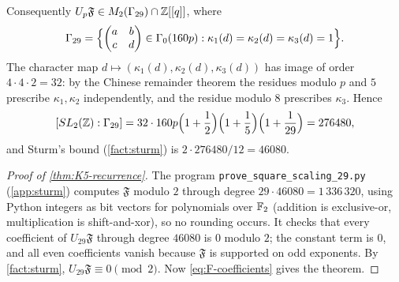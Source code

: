 Consequently $U_p\mathfrak F\in M_2(\Gamma_{29})\cap\mathbb{Z}[[q]]$, where
\[
  \Gamma_{29}=\Bigl\{\begin{pmatrix}a&b\\c&d\end{pmatrix}\in\Gamma_0(160p):
  \kappa_1(d)=\kappa_2(d)=\kappa_3(d)=1\Bigr\}.
\]
The character map $d\mapsto(\kappa_1(d),\kappa_2(d),\kappa_3(d))$ has image of order
$4\cdot4\cdot2=32$: by the Chinese remainder theorem the residues modulo $p$ and $5$
prescribe $\kappa_1,\kappa_2$ independently, and the residue modulo $8$ prescribes
$\kappa_3$. Hence
\[
  [SL_2(\mathbb{Z}):\Gamma_{29}]=32\cdot160p\Bigl(1+\frac12\Bigr)\Bigl(1+\frac15\Bigr)\Bigl(1+\frac1{29}\Bigr)=276480,
\]
and Sturm's bound (\cref{fact:sturm}) is $2\cdot276480/12=46080$.

\begin{proof}[Proof of \cref{thm:K5-recurrence}]
The program \texttt{prove\_square\_scaling\_29.py} (\cref{app:sturm}) computes
$\mathfrak F$ modulo $2$ through degree $29\cdot46080=1\,336\,320$, using Python
integers as bit vectors for polynomials over $\mathbb{F}_2$ (addition is exclusive-or,
multiplication is shift-and-xor), so no rounding occurs. It checks that every
coefficient of $U_{29}\mathfrak F$ through degree $46080$ is $0$ modulo $2$; the
constant term is $0$, and all even coefficients vanish because $\mathfrak F$ is
supported on odd exponents. By \cref{fact:sturm}, $U_{29}\mathfrak F\equiv0\pmod2$.
Now \eqref{eq:F-coefficients} gives the theorem.
\end{proof}
